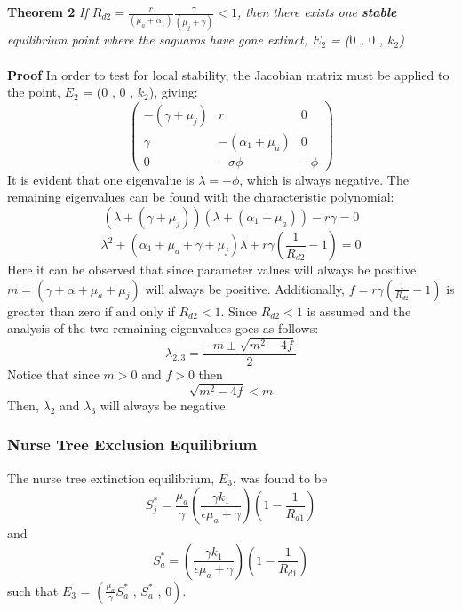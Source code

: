\documentclass[a4paper]{article}
\begin{document}
\textbf{Theorem 2} \textit{If $R_{d2} = \displaystyle\frac{r}{(\mu_a+\alpha_1)}\frac{\gamma}{(\mu_j+\gamma)}<1$, then there exists one \textbf{stable} equilibrium point where the saguaros have gone extinct, $E_2$ = ($0$ , $0$ , $k_2$) } \\ \\
\textbf{Proof}
In order to test for local stability, the Jacobian matrix must be applied to the point, $E_2$ = (0 , 0 , $k_2$), giving:
$$ \begin{pmatrix}
-(\gamma +\mu_j) & r & 0\\
\gamma & -(\alpha_1+\mu_a) & 0\\
0 & -\sigma \phi & -\phi
\end{pmatrix}$$
It is evident that one eigenvalue is $\lambda = -\phi$, which is always negative.
The remaining eigenvalues can be found with the characteristic polynomial:\newline
\begin{equation*}
(\lambda + (\gamma + \mu_j))(\lambda + (\alpha_1 + \mu_a)) - r\gamma = 0
\end{equation*}
\begin{equation*}
\lambda^2 + (\alpha_1 + \mu_a + \gamma + \mu_j)\lambda + r\gamma \left(\frac{1}{R_{d2}} - 1 \right) = 0
\end{equation*}
Here it can be observed that since parameter values will always be positive, $m = (\gamma + \alpha + \mu_a + \mu_j)$ will always be positive. Additionally, $f = r\gamma\left(\frac{1}{R_{d2}} - 1\right)$ is greater than zero if and only if $R_{d2} < 1.$ Since $R_{d2} < 1$ is assumed and the analysis of the two remaining eigenvalues goes as follows:\newline
\begin{equation*}
\lambda_{2,3} = \frac{-m \pm \sqrt{m^2 - 4f}}{2}
\end{equation*}
Notice that since $m > 0$ and $f > 0$ then
\begin{equation*}
 \sqrt{m^2 - 4f}<m
\end{equation*}
Then, $\lambda_2$ and $\lambda_3$ will always be negative.

\subsubsection{Nurse Tree Exclusion Equilibrium}
The nurse tree extinction equilibrium, $E_3$, was found to be
$$S_j^* = \displaystyle\frac{\mu_a}{\gamma}\left(\frac{\gamma k_1}{\epsilon \mu_a + \gamma}\right)\left(1 - \frac{1}{R_{d1}}\right)$$
and
$$S_a^* = \left(\frac{\gamma k_1}{\epsilon \mu_a + \gamma}\right)\left(1 - \frac{1}{R_{d1}}\right)$$
such that 
$E_3$ = $\left(\displaystyle\frac{\mu_a}{\gamma}S_a^* \text{ , }  S_a^* \text{ , } 0\right)$.\\
\end{document}
